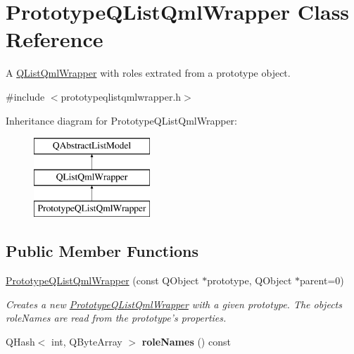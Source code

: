 \hypertarget{classPrototypeQListQmlWrapper}{\section{Prototype\-Q\-List\-Qml\-Wrapper Class Reference}
\label{classPrototypeQListQmlWrapper}
}


A \hyperlink{classQListQmlWrapper}{Q\-List\-Qml\-Wrapper} with roles extrated from a prototype object.  




{\ttfamily \#include $<$prototypeqlistqmlwrapper.\-h$>$}

Inheritance diagram for Prototype\-Q\-List\-Qml\-Wrapper\-:\begin{figure}[H]
\begin{center}
\leavevmode
\includegraphics[height=3.000000cm]{classPrototypeQListQmlWrapper}
\end{center}
\end{figure}
\subsection*{Public Member Functions}
\begin{DoxyCompactItemize}
\item 
\hyperlink{classPrototypeQListQmlWrapper_aa57c170d4bc111a8d0e3fb029d9aee07}{Prototype\-Q\-List\-Qml\-Wrapper} (const Q\-Object $\ast$prototype, Q\-Object $\ast$parent=0)
\begin{DoxyCompactList}\small\item\em Creates a new {\ttfamily \hyperlink{classPrototypeQListQmlWrapper}{Prototype\-Q\-List\-Qml\-Wrapper}} with a given prototype. The objects role\-Names are read from the prototype's properties. \end{DoxyCompactList}\item 
\hypertarget{classPrototypeQListQmlWrapper_aebafcec43fe90b0913b05def79db52fb}{Q\-Hash$<$ int, Q\-Byte\-Array $>$ {\bfseries role\-Names} () const }\label{classPrototypeQListQmlWrapper_aebafcec43fe90b0913b05def79db52fb}

\end{DoxyCompactItemize}
